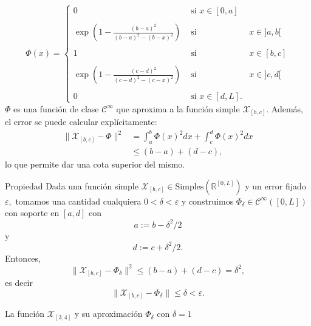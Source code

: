 \documentclass[10pt,handout]{beamer}
\theoremstyle{plain} %
\theoremstyle{plain} %
\theoremstyle{plain} %
\theoremstyle{plain} %
\theoremstyle{definition}
\theoremstyle{example}
\theoremstyle{example}
\theoremstyle{remark}
\theoremstyle{remark}
\begin{document}
\begin{frame}
$$
\Phi(x)= \left\{
\begin{array}{ccc}
0 & \text{ si } x \in [0,a] \\ 
& & \\ 
\exp\left(1- \frac{(b-a)^2}{(b-a)^2-(b-x)^2}\right) & \text{ si } & x \in ]a,b[ \\ 
 &  & \\ 
1 & \text{ si } & x \in [b,c] \\
& & \\
\exp\left(1- \frac{(c-d)^2}{(c-d)^2-(c-x)^2}\right) & \text{ si } & x \in ]c,d[ \\ 
& & \\ 
0 & \text{ si } x \in [d,L].
\end{array}
\right.
$$
$\Phi$ es una función de clase $\mathcal{C}^{\infty}$ que aproxima a la función simple 
$\mathcal{X}_{[b,c]}.$ Además, el error se puede calcular explícitamente:
\begin{align*}
\|\mathcal{X}_{[b,c]}-\Phi\|^2 & = \int_a^b \Phi(x)^2 dx +  \int_c^d \Phi(x)^2 dx \\ 
& \le (b-a)+(d-c),
\end{align*}
lo que permite dar una cota superior del mismo.
\end{frame}

\begin{frame}{Propiedad}
Dada una función simple $\mathcal{X}_{[b,c]} \in \mathrm{Simples}(\mathbb{R}^{[0,L]})$ y un error fijado $\varepsilon,$ tomamos una cantidad cualquiera $0 < \delta < \varepsilon$ y construimos
$\Phi_{\delta} \in \mathcal{C}^{\infty}([0,L])$ con soporte en $[a,d]$ con $$a:=b-\delta^2/2$$ y $$d:=c+\delta^2/2.$$
Entonces,
$$
\|\mathcal{X}_{[b,c]}-\Phi_{\delta}\|^2 \le (b-a)+(d-c) = \delta^2,
$$
es decir
$$
\|\mathcal{X}_{[b,c]}-\Phi_{\delta}\| \le \delta < \varepsilon.
$$
\end{frame}

\begin{frame}{La función $\mathcal{X}_{[3,4]}$ y su aproximación $\Phi_{\delta}$ con $\delta = 1$}
\end{frame}
\end{document}
